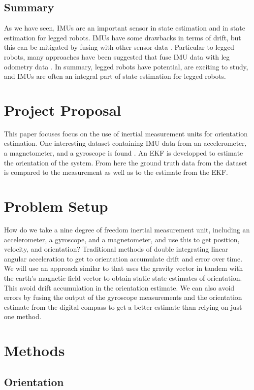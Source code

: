 \documentclass[conference]{IEEEtran}
\begin{document}
\subsection{Summary}
As we have seen, IMUs are an important sensor in state estimation and in state estimation for legged robots. IMUs have some drawbacks in terms of drift, but this can be mitigated by fusing with other sensor data \cite{b5} \cite{b7} \cite{b12}. Particular to legged robots, many approaches have been suggested that fuse IMU data with leg odometry data \cite{b12} \cite{b13} \cite{b15}. In summary, legged robots have potential, are exciting to study, and IMUs are often an integral part of state estimation for legged robots.

\section{Project Proposal}
This paper focuses focus on the use of inertial measurement units for orientation estimation. One interesting dataset containing IMU data from an accelerometer, a magnetometer, and a gyroscope is found \cite{b20}. An EKF is developped to estimate the orientation of the system. From here the ground truth data from the dataset is compared to the measurement as well as to the estimate from the EKF.

\section{Problem Setup}

How do we take a nine degree of freedom inertial measurement unit, including an accelerometer, a gyroscope, and a magnetometer, and use this to get position, velocity, and orientation? Traditional methods of double integrating linear angular acceleration to get to orientation accumulate drift and error over time. We will use an approach similar to \cite{b19} that uses the gravity vector in tandem with the earth's magnetic field vector to obtain static state estimates of orientation. This avoid drift accumulation in the orientation estimate. We can also avoid errors by fusing the output of the gyroscope measurements and the orientation estimate from the digital compass to get a better estimate than relying on just one method.

\section{Methods}

\subsection{Orientation}
\end{document}
